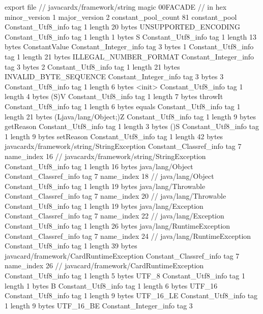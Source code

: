 export file {		// javacardx/framework/string
	magic	00FACADE		 // in hex
	minor_version	1
	major_version	2
	constant_pool_count	81
	constant_pool {
		Constant_Utf8_info {
			tag	1
			length	20
			bytes	UNSUPPORTED_ENCODING
		}
		Constant_Utf8_info {
			tag	1
			length	1
			bytes	S
		}
		Constant_Utf8_info {
			tag	1
			length	13
			bytes	ConstantValue
		}
		Constant_Integer_info {
			tag	3
			bytes	1
		}
		Constant_Utf8_info {
			tag	1
			length	21
			bytes	ILLEGAL_NUMBER_FORMAT
		}
		Constant_Integer_info {
			tag	3
			bytes	2
		}
		Constant_Utf8_info {
			tag	1
			length	21
			bytes	INVALID_BYTE_SEQUENCE
		}
		Constant_Integer_info {
			tag	3
			bytes	3
		}
		Constant_Utf8_info {
			tag	1
			length	6
			bytes	<init>
		}
		Constant_Utf8_info {
			tag	1
			length	4
			bytes	(S)V
		}
		Constant_Utf8_info {
			tag	1
			length	7
			bytes	throwIt
		}
		Constant_Utf8_info {
			tag	1
			length	6
			bytes	equals
		}
		Constant_Utf8_info {
			tag	1
			length	21
			bytes	(Ljava/lang/Object;)Z
		}
		Constant_Utf8_info {
			tag	1
			length	9
			bytes	getReason
		}
		Constant_Utf8_info {
			tag	1
			length	3
			bytes	()S
		}
		Constant_Utf8_info {
			tag	1
			length	9
			bytes	setReason
		}
		Constant_Utf8_info {
			tag	1
			length	42
			bytes	javacardx/framework/string/StringException
		}
		Constant_Classref_info {
			tag	7
			name_index	16		// javacardx/framework/string/StringException
		}
		Constant_Utf8_info {
			tag	1
			length	16
			bytes	java/lang/Object
		}
		Constant_Classref_info {
			tag	7
			name_index	18		// java/lang/Object
		}
		Constant_Utf8_info {
			tag	1
			length	19
			bytes	java/lang/Throwable
		}
		Constant_Classref_info {
			tag	7
			name_index	20		// java/lang/Throwable
		}
		Constant_Utf8_info {
			tag	1
			length	19
			bytes	java/lang/Exception
		}
		Constant_Classref_info {
			tag	7
			name_index	22		// java/lang/Exception
		}
		Constant_Utf8_info {
			tag	1
			length	26
			bytes	java/lang/RuntimeException
		}
		Constant_Classref_info {
			tag	7
			name_index	24		// java/lang/RuntimeException
		}
		Constant_Utf8_info {
			tag	1
			length	39
			bytes	javacard/framework/CardRuntimeException
		}
		Constant_Classref_info {
			tag	7
			name_index	26		// javacard/framework/CardRuntimeException
		}
		Constant_Utf8_info {
			tag	1
			length	5
			bytes	UTF_8
		}
		Constant_Utf8_info {
			tag	1
			length	1
			bytes	B
		}
		Constant_Utf8_info {
			tag	1
			length	6
			bytes	UTF_16
		}
		Constant_Utf8_info {
			tag	1
			length	9
			bytes	UTF_16_LE
		}
		Constant_Utf8_info {
			tag	1
			length	9
			bytes	UTF_16_BE
		}
		Constant_Integer_info {
			tag	3
}}}
